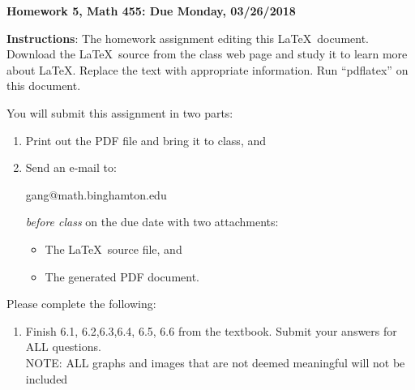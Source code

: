 \documentclass[11pt]{article}
\begin{document}
\begin{title}
	{\Large\bf Homework 5, Math 455: Due Monday, 03/26/2018}
\end{title}

\author{\bf Your Name: Ganggang Xu}

\maketitle
{\bf Instructions}:  The homework assignment editing this \LaTeX\ document.  Download the \LaTeX\ source from the class web page and study
it to learn more about \LaTeX.  Replace the text with appropriate information.  Run ``pdflatex'' on this document.

You will submit this assignment in two parts:
\begin{enumerate}
\item Print out the PDF file and bring it to class, and
\item Send an e-mail to:
\begin{center}
gang@math.binghamton.edu
\end{center}
\emph{before class} on the due date with two attachments:
\begin{itemize}
\item The \LaTeX\ source file, and
\item The generated PDF document.
\end{itemize}
\end{enumerate}
\newpage
Please complete the following:
\begin{enumerate}
\item  Finish 6.1, 6.2,6.3,6.4, 6.5, 6.6 from the textbook.  Submit your
answers for {\color{red}ALL} questions.\\
NOTE: ALL graphs and images that are not deemed meaningful will not be included
\end{enumerate}
\end{document}
